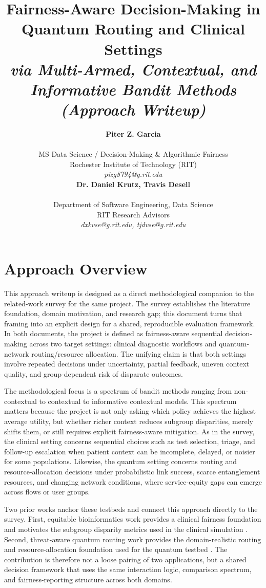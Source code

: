 \documentclass{IEEEtran}
\title{Fairness-Aware Decision-Making in Quantum Routing and Clinical Settings\\[0.3em]
{\large\textit{via Multi-Armed, Contextual, and Informative Bandit Methods}}\\[0.3em]
{\large\textit{(Approach Writeup)}}}
\author{%
\begin{minipage}{0.48\textwidth}
\begin{center}
{\bf Piter Z. Garcia}\\
\begin{small}
MS Data Science / Decision-Making \& Algorithmic Fairness\\
Rochester Institute of Technology (RIT)\\
{\it pizg8794@g.rit.edu}
\end{small}
\end{center}
\end{minipage}
\hfill
\begin{minipage}{0.48\textwidth}
\begin{center}
{\bf Dr. Daniel Krutz, Travis Desell}\\
\begin{small}
Department of Software Engineering, Data Science\\
RIT Research Advisors\\
{\it dxkvse@g.rit.edu, tjdvse@g.rit.edu}
\end{small}
\end{center}
\end{minipage}%
}
\begin{document}
\maketitle

\section{Approach Overview}
This approach writeup is designed as a direct methodological companion to the related-work
survey for the same project. The survey establishes the literature foundation, domain
motivation, and research gap; this document turns that framing into an explicit design for a
shared, reproducible evaluation framework. In both documents, the project is defined as
fairness-aware sequential decision-making across two target settings: clinical diagnostic
workflows and quantum-network routing/resource allocation. The unifying claim is that both
settings involve repeated decisions under uncertainty, partial feedback, uneven context
quality, and group-dependent risk of disparate outcomes.

The methodological focus is a spectrum of bandit methods ranging from non-contextual to
contextual to informative contextual models. This spectrum matters because the project is
not only asking which policy achieves the highest average utility, but whether richer context
reduces subgroup disparities, merely shifts them, or still requires explicit fairness-aware
mitigation. As in the survey, the clinical setting concerns sequential choices such as test
selection, triage, and follow-up escalation when patient context can be incomplete, delayed,
or noisier for some populations. Likewise, the quantum setting concerns routing and
resource-allocation decisions under probabilistic link success, scarce entanglement
resources, and changing network conditions, where service-equity gaps can emerge across
flows or user groups.

Two prior works anchor these testbeds and connect this approach directly to the survey.
First, equitable bioinformatics work provides a clinical fairness foundation and motivates
the subgroup disparity metrics used in the clinical simulation
\cite{garcia2025equitable_bioinformatics}. Second, threat-aware quantum routing work
provides the domain-realistic routing and resource-allocation foundation used for the
quantum testbed \cite{garcia2026threat_aware_quantum_routing}. The contribution is
therefore not a loose pairing of two applications, but a shared decision framework that uses
the same interaction logic, comparison spectrum, and fairness-reporting structure across
both domains.
\end{document}
